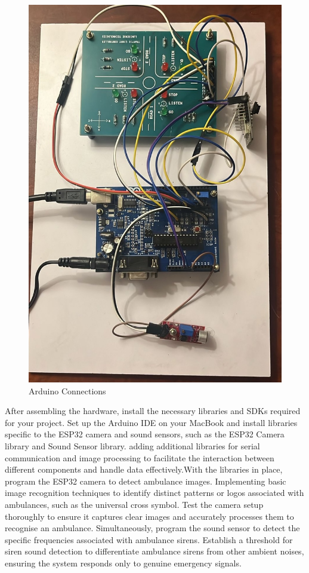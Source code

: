 \documentclass[conference]{IEEEtran}
\begin{document}
\begin{figure}[htbp]
    \centering
    \includegraphics[width=1\linewidth]{WhatsApp Image 2024-11-07 at 00.23.00.jpeg}
    \caption{Arduino Connections}
    \label{fig:enter-label}
\end{figure}

After assembling the hardware, install the necessary libraries and SDKs required for your project. Set up the Arduino IDE on your MacBook and install libraries specific to the ESP32 camera and sound sensors, such as the ESP32 Camera library and Sound Sensor library. adding additional libraries for serial communication and image processing to facilitate the interaction between different components and handle data effectively.With the libraries in place, program the ESP32 camera to detect ambulance images. Implementing basic image recognition techniques to identify distinct patterns or logos associated with ambulances, such as the universal cross symbol. Test the camera setup thoroughly to ensure it captures clear images and accurately processes them to recognise an ambulance. Simultaneously, program the sound sensor to detect the specific frequencies associated with ambulance sirens. Establish a threshold for siren sound detection to differentiate ambulance sirens from other ambient noises, ensuring the system responds only to genuine emergency signals.
\end{document}
